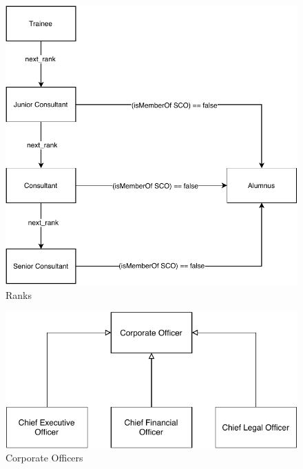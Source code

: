 \documentclass[a4paper, DIV=13, BCOR=0cm]{scrbook}
\begin{document}
\begin{figure}[h]
	\caption{Ranks}
	\centering
	\includegraphics[width=1\textwidth]{Diagrams/ranks.pdf}
\end{figure}

\begin{figure}[h]
	\caption{Corporate Officers}
	\centering
	\includegraphics[width=1\textwidth]{Diagrams/corporate-officers.pdf}
\end{figure}


\clearpage
\end{document}
